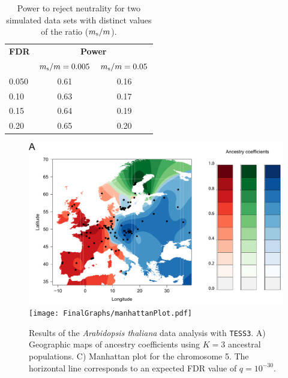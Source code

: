 \begin{table}
\begin{center}
\begin{tabular}{lcc}
 \hline
\textbf{FDR}  & \multicolumn{2}{c}{\textbf{Power}}  \\
 & $m_{\rm s} / m = 0.005$ & $m_{\rm s} / m = 0.05$ \\
\hline
 0.050 & 0.61& 0.16 \\
 0.10 & 0.63 & 0.17\\
 0.15 & 0.64 & 0.19 \\
 0.20 & 0.65 & 0.20 \\
 \hline
\end{tabular}
\end{center}
\caption{Power to reject neutrality for two simulated data sets with distinct values of the ratio ($m_{\rm s} / m$).}
\end{table}


\clearpage	
\newpage


\begin{figure}[h!]\centering
\includegraphics[width=\linewidth]{FinalGraphs/barsClusters.pdf}
\texttt{[image: FinalGraphs/manhattanPlot.pdf]}
\caption{Results of the {\it Arabidopsis thaliana} data analysis with {\tt TESS3}. A) Geographic maps of ancestry coefficients using $K = 3$ ancestral populations. C) Manhattan plot for the chromosome 5. The horizontal line corresponds to an expected FDR value of $q = 10^{-30}$. }
\end{figure}    

\clearpage
\newpage 

